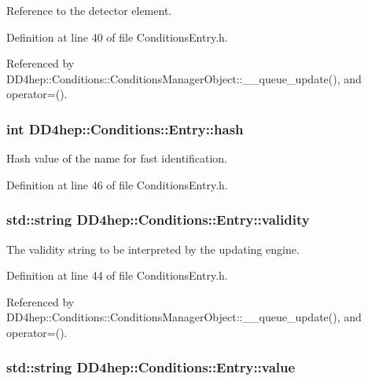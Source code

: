 Reference to the detector element. 

Definition at line 40 of file ConditionsEntry.h.

Referenced by DD4hep::Conditions::ConditionsManagerObject::\_\-\_\-queue\_\-update(), and operator=().\hypertarget{class_d_d4hep_1_1_conditions_1_1_entry_a7f213cb001c089b5aa3ed890aa1f05b5}{
\subsubsection[{hash}]{\setlength{\rightskip}{0pt plus 5cm}int {\bf DD4hep::Conditions::Entry::hash}}}
\label{class_d_d4hep_1_1_conditions_1_1_entry_a7f213cb001c089b5aa3ed890aa1f05b5}


Hash value of the name for fast identification. 

Definition at line 46 of file ConditionsEntry.h.\hypertarget{class_d_d4hep_1_1_conditions_1_1_entry_a9a559618af3b8d15be51c806e40d1764}{
\subsubsection[{validity}]{\setlength{\rightskip}{0pt plus 5cm}std::string {\bf DD4hep::Conditions::Entry::validity}}}
\label{class_d_d4hep_1_1_conditions_1_1_entry_a9a559618af3b8d15be51c806e40d1764}


The validity string to be interpreted by the updating engine. 

Definition at line 44 of file ConditionsEntry.h.

Referenced by DD4hep::Conditions::ConditionsManagerObject::\_\-\_\-queue\_\-update(), and operator=().\hypertarget{class_d_d4hep_1_1_conditions_1_1_entry_a28dbb34f86ab05df22df9f9756100bcf}{
\subsubsection[{value}]{\setlength{\rightskip}{0pt plus 5cm}std::string {\bf DD4hep::Conditions::Entry::value}}}
\label{class_d_d4hep_1_1_conditions_1_1_entry_a28dbb34f86ab05df22df9f9756100bcf}


